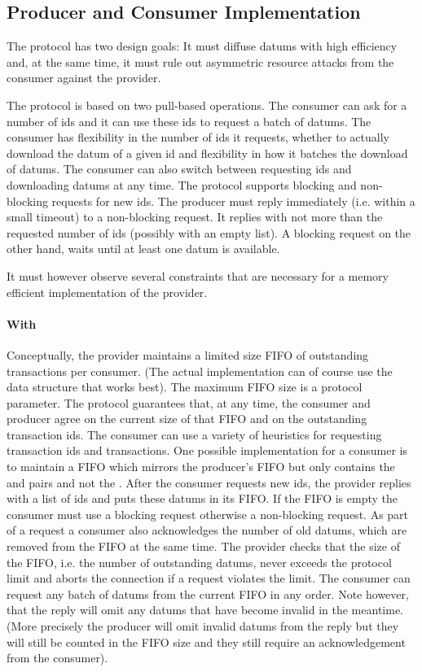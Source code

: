 \subsection{Producer and Consumer Implementation}
The protocol has two design goals: It must diffuse datums with high efficiency
and, at the same time, it must rule out
asymmetric resource attacks from the consumer against the provider.

The protocol is based on two pull-based operations.
The consumer can ask for a number of ids and it can use these
ids to request a batch of datums.
The consumer has flexibility in the number of ids it requests,
whether to actually download the datum of a given id
and flexibility in how it batches the download of datums.
The consumer can also switch between requesting ids and downloading
datums at any time. The protocol supports blocking and non-blocking requests for new ids.
The producer must reply immediately (i.e. within a small timeout) to a non-blocking request.
It replies with not more than the requested number of ids (possibly with an empty list).
A blocking request on the other hand, waits until at least one datum is available.

It must however observe several constraints that are necessary for a
memory efficient implementation of the provider.

\paragraph{With \BoundedWindow{}}
Conceptually, the provider maintains a limited size FIFO of outstanding transactions per consumer.
(The actual implementation can of course use the data structure that works best).
The maximum FIFO size is a protocol parameter.
The protocol guarantees that, at any time, the consumer and producer agree on the current size of
that FIFO and on the outstanding transaction ids.
The consumer can use a variety of heuristics for requesting transaction ids and transactions.
One possible implementation for a consumer is to maintain a FIFO which mirrors the producer's FIFO
but only contains the \id{} and \info{} pairs and not the \datum{}.
%
After the consumer requests new ids, the provider replies with a list of ids and
puts these datums in its FIFO. If the FIFO is empty the consumer must use a blocking
request otherwise a non-blocking request.
As part of a request a consumer also acknowledges the number of old datums,
which are removed from the FIFO at the same time.
The provider checks that the size of the FIFO, i.e. the number of outstanding datums,
never exceeds the protocol limit and aborts the connection if a request violates the limit.
The consumer can request any batch of datums from the current FIFO in any order.
Note however, that the reply will omit any datums that have become invalid in the meantime.
(More precisely the producer will omit invalid datums from the reply but they will still be counted in the FIFO
size and they still require an acknowledgement from the consumer).

